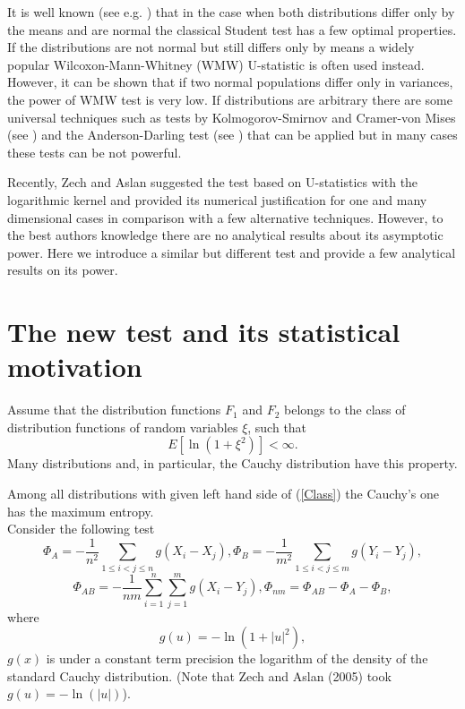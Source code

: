 \documentclass{svproc}
\begin{document}
It is well known (see e.g. \cite{Lehman1986}) that in the case when both distributions differ only by the means and are normal the classical Student test has a few optimal properties. If the distributions are not normal but still differs only by means a widely popular Wilcoxon-Mann-Whitney (WMW) U-statistic is often used instead. However, it can be shown that if two normal populations differ only in variances, the power of WMW test is very low.
If distributions are arbitrary there are some universal techniques such as tests by Kolmogorov-Smirnov and Cramer-von Mises  (see \cite{Buening2001}) and the Anderson-Darling test (see \cite{Anderson2011}) that can be applied but in many cases these tests can be not powerful.

Recently, Zech and Aslan  \cite{AslanZech2005} suggested the test based on U-statistics with the logarithmic kernel and provided its numerical justification for one and many dimensional cases in comparison with a few alternative techniques.  However, to the best authors knowledge there are no analytical results about its asymptotic power. Here we introduce a similar but different test and provide a few analytical results on its power.





\section{The new test and its statistical motivation}

Assume that the distribution functions
$F_1$ and $F_2$ belongs to the class of distribution functions of random variables  $\xi$, such that
\begin {equation}\label{Class}
E [\ln (1+ \xi^2)     ] < \infty.
\end{equation}
Many distributions and, in particular, the Cauchy distribution have this property.
 \bigskip

Among all distributions with given left hand side of (\ref{Class}) the Cauchy's one has the maximum entropy.\\


Consider the following test
\begin{equation}\label{K}
 \Phi_{A}=-\frac{1}{n^2}\sum_{1\leq i<j\leq n} g(X_i-X_j),
\Phi_{B}=-\frac{1}{m^2}\sum_{1\leq i<j\leq m} g(Y_i-Y_j),
\end{equation}
\begin{equation}\label{K1}
\Phi_{AB}=-\frac{1}{nm}\sum_{i=1}^n\sum_{j=1}^m g(X_i-Y_j),
\Phi_{nm}=\Phi_{AB}-\Phi_{A}- \Phi_{B},
\end{equation}
where
$$
g(u)= -\ln (1+|u|^2),
$$
$g(x)$ is under a constant term precision the logarithm of the density of the standard Cauchy distribution.
(Note that Zech and Aslan (2005) took $g(u)= -\ln(|u|)$).
\end{document}
